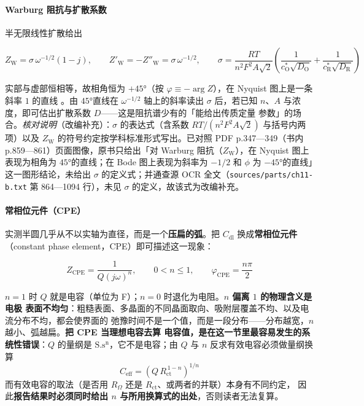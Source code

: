 \paragraph{Warburg 阻抗与扩散系数} 半无限线性扩散给出

\begin{equation}
Z_{\mathrm{W}}=\sigma\,\omega^{-1/2}(1-j),
\qquad
Z'_{\mathrm{W}}=-Z''_{\mathrm{W}}=\sigma\,\omega^{-1/2},
\qquad
\sigma=\frac{RT}{n^{2}F^{2}A\sqrt{2}}
\left(\frac{1}{c_{\mathrm{O}}^{*}\sqrt{D_{\mathrm{O}}}}
+\frac{1}{c_{\mathrm{R}}^{*}\sqrt{D_{\mathrm{R}}}}\right)
\label{eq:eis-d-warburg}
\end{equation}

实部与虚部恒相等，故相角恒为 $+45$°（按 $\varphi\equiv-\arg Z$），在 Nyquist 图上是一条斜率 $1$ 的直线
。由 $45$°直线在 $\omega^{-1/2}$ 轴上的斜率读出
$\sigma$ 后，若已知 $n$、$A$ 与浓度，即可估出扩散系数 $D$——这是阻抗谱少有的「能给出传质定量
参数」的场合。\emph{核对说明}（改编补充）：$\sigma$ 的表达式（含系数 $RT/(n^{2}F^{2}A\sqrt{2})$ 与括号内两项）以及 $Z_{\mathrm{W}}$ 的符号约定按学科标准形式写出。已对照 PDF p.347—349（书内 p.859—861）页面图像，原书只给出「对 Warburg 阻抗（$Z_{\mathrm{W}}$），在 Nyquist 图上表现为相角为 $45$°的直线；在 Bode 图上表现为斜率为 $-1/2$ 和 $\phi$ 为 $-45$°的直线」这一图形结论，未给出 $\sigma$ 的定义式；并通查源 OCR 全文（\texttt{sources/parts/ch11-b.txt} 第 864—1094 行），未见 $\sigma$ 的定义，故该式为改编补充。

\paragraph{常相位元件（CPE）} 实测半圆几乎从不以实轴为直径，而是一个\textbf{压扁的弧}。把
$C_{\mathrm{dl}}$ 换成\textbf{常相位元件}（constant phase element，CPE）即可描述这一现象：

\begin{equation}
Z_{\mathrm{CPE}}=\frac{1}{Q(j\omega)^{n}},\qquad 0<n\le1,
\qquad
\varphi_{\mathrm{CPE}}=\frac{n\pi}{2}
\label{eq:eis-d-cpe}
\end{equation}

$n=1$ 时 $Q$ 就是电容（单位为 F）；$n=0$ 时退化为电阻。\textbf{$n$ 偏离 $1$ 的物理含义是电极
表面不均匀}：粗糙表面、多晶面的不同晶面取向、吸附层覆盖不均、以及电流分布不均，都会使界面的
弛豫时间不是一个值，而是一段分布——分布越宽，$n$ 越小、弧越扁。\textbf{把 CPE 当理想电容去算
电容值，是在这一节里最容易发生的系统性错误}：$Q$ 的量纲是 $\mathrm{S.s^{n}}$，它不是电容；由
$Q$ 与 $n$ 反求有效电容必须做量纲换算
\begin{equation}
C_{\mathrm{eff}}=\left(Q\,R_{\mathrm{ct}}^{\,1-n}\right)^{1/n}
\label{eq:eis-d-cpeceff}
\end{equation}
而有效电容的取法（是否用 $R_{\Omega}$ 还是 $R_{\mathrm{ct}}$、或两者的并联）本身有不同约定，
因此\textbf{报告结果时必须同时给出 $n$ 与所用换算式的出处}，否则读者无法复算。

